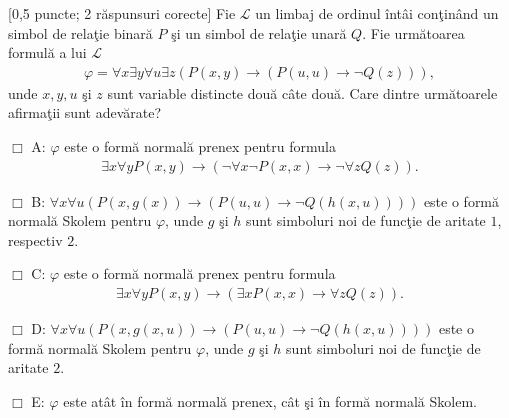 \documentclass[12pt]{article}
\newcommand{\probex}{\stepcounter{uebno}{\vspace{0.3cm}\noindent \bf (P\arabic{uebno}) }}
\newcommand{\solutiong}[1]{$\,$ \\ \begin{proof}\mbox{}\\#1 \qed \end{proof}}
\renewcommand{\boxtimes}{\Box}
\renewcommand{\solutiong}[1]{}
\begin{document}
\probex [0,5 puncte; 2 r\u{a}spunsuri corecte]
Fie $\mathcal{L}$ un limbaj de ordinul \^{i}nt\^{a}i con\c{t}in\^{a}nd 
un simbol de rela\c{t}ie binar\u{a} $P$ \c{s}i un simbol de rela\c{t}ie unar\u{a} 
$Q$.
Fie urm\u{a}toarea formul\u{a} a lui $\mathcal{L}$
\begin{align*}
\varphi = \forall x \exists y \forall u \exists z 
(P(x, y) \to (P(u, u) \to \neg Q(z))), 
\end{align*}
unde $x, y, u$ \c{s}i $z$ sunt variable distincte dou\u{a} c\^{a}te dou\u{a}.
Care dintre urm\u{a}toarele afirma\c{t}ii sunt adev\u{a}rate? 

$\boxtimes$ A: $\varphi$ este o form\u{a} normal\u{a} prenex pentru formula 
\begin{align*}
\exists x \forall y P(x, y) \to (\neg \forall x \neg P(x, x) \to \neg \forall z Q(z)).
\end{align*}

$\boxtimes$ B: $\forall x \forall u (P(x, g(x)) \to (P(u, u) \to \neg Q(h(x, u))))$ este o form\u{a} normal\u{a} Skolem pentru $\varphi$,
unde $g$ \c{s}i $h$ sunt simboluri noi de func\c{t}ie de aritate $1$, respectiv $2$.

$\Box$ C: $\varphi$ este o form\u{a} normal\u{a} prenex pentru formula 
\begin{align*}
\exists x \forall y P(x, y) \to (\exists x P(x, x) \to \forall z Q(z)).
\end{align*}

$\Box$ D: $\forall x \forall u (P(x, g(x, u)) \to (P(u, u) \to \neg Q(h(x, u))))$ este o form\u{a} normal\u{a} Skolem pentru $\varphi$,
unde $g$ \c{s}i $h$ sunt simboluri noi de func\c{t}ie de aritate $2$. 

$\Box$ E: $\varphi$ este at\^{a}t \^{i}n form\u{a} normal\u{a} prenex, c\^{a}t \c{s}i \^{i}n form\u{a} normal\u{a} Skolem.

\solutiong{
Varianta A este corect\u{a} pentru forma prenex: 
\begin{align*}
    \exists x \forall y P(x, y) \to (\neg \forall x \neg P(x, x) \to \neg \forall z Q(z)) \vDashv \\ 
    \exists x \forall y P(x, y) \to (\exists x P(x, x) \to \exists z \neg Q(z)) \vDashv \\ 
    \exists x \forall y P(x, y) \to (\exists u P(u, u) \to \exists z \neg Q(z)) \vDashv \\ 
    \exists x \forall y P(x, y) \to \forall u \exists z (P(u, u) \to \neg Q(z)) \vDashv \\ 
    \forall x \exists y (P(x, y) \to \forall u \exists z (P(u, u) \to \neg Q(z))) \vDashv \\ 
    \forall x \exists y \forall u \exists z (P(x, y) \to (P(u, u) \to \neg Q(z))) \\ 
\end{align*}
}
\end{document}
